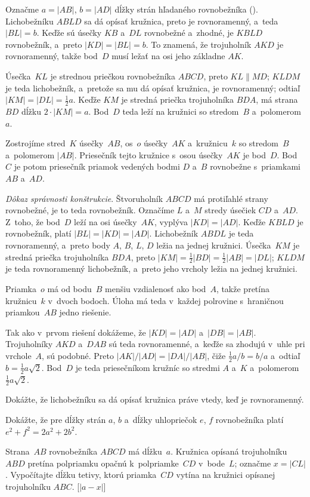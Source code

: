 {%
Označme $a=|AB|$, $b=|AD|$ dĺžky strán hľadaného rovnobežníka (\obr). Lichobežníku $ABLD$ sa dá opísať kružnica, preto je rovnoramenný, a~teda $|BL|=b$. Keďže sú úsečky $KB$ a~$DL$ rovnobežné a~zhodné, je $KBLD$ rovnobežník, a~preto $|KD|=|BL|=b$. To znamená, že trojuholník $AKD$ je rovnoramenný, takže bod~$D$ musí ležať na osi jeho základne $AK$.
%

Úsečka~$KL$ je strednou priečkou rovnobežníka $ABCD$, preto $KL \parallel MD$; $KLDM$ je teda lichobežník, a~pretože sa mu dá opísať kružnica, je rovnoramenný; odtiaľ $|KM|=|DL|=\frac12a$. Keďže $KM$ je stredná priečka trojuholníka $BDA$, má strana~$BD$ dĺžku $2\cdot|KM|=a$. Bod~$D$ teda leží na kružnici so stredom~$B$ a~polomerom~$a$.

\konstrukcia
Zostrojíme stred~$K$ úsečky~$AB$, os~$o$ úsečky~$AK$ a~kružnicu~$k$ so stredom~$B$ a~polomerom $|AB|$. Priesečník tejto kružnice s~osou úsečky~$AK$ je bod~$D$. Bod~$C$ je potom priesečník priamok vedených bodmi $D$ a~$B$ rovnobežne s~priamkami $AB$ a~$AD$.

\smallskip
{\it Dôkaz správnosti konštrukcie}.
Štvoruholník $ABCD$ má protiľahlé strany rovnobežné, je to teda rovnobežník. Označíme $L$ a~$M$ stredy úsečiek $CD$ a~$AD$. Z~toho, že bod~$D$ leží na osi úsečky~$AK$, vyplýva $|KD|=|AD|$. Keďže $KBLD$ je rovnobežník, platí $|BL|=|KD|=|AD|$. Lichobežník $ABDL$ je teda rovnoramenný, a~preto body $A$, $B$, $L$, $D$ ležia na jednej kružnici. Úsečka~$KM$ je stredná priečka trojuholníka $BDA$, preto $|KM|=\frac12|BD|=\frac12|AB|=|DL|$; $KLDM$ je teda rovnoramenný lichobežník, a~preto jeho vrcholy ležia na jednej kružnici.

\diskusia
Priamka~$o$ má od bodu~$B$ menšiu vzdialenosť ako bod~$A$, takže pretína kružnicu~$k$ v~dvoch bodoch. Úloha má teda v~každej polrovine s~hraničnou priamkou~$AB$ jedno riešenie.

\ineriesenie
Tak ako v~prvom riešení dokážeme, že $|KD|=|AD|$ a~$|DB|=|AB|$. Trojuholníky $AKD$ a~$DAB$ sú teda rovnoramenné, a~keďže sa zhodujú v~uhle pri vrchole~$A$, sú podobné. Preto ${|AK|}/{|AD|}={|DA|}/{|AB|}$, čiže $\frac12a/b=b/a$ a~odtiaľ $b=\frac12{a\sqrt 2}$. Bod~$D$ je teda priesečníkom kružníc so stredmi $A$ a~$K$ a~polomerom $\frac12{a\sqrt 2}$.

Dokážte, že lichobežníku sa dá opísať kružnica práve vtedy, keď je rovnoramenný.

Dokážte, že pre dĺžky strán $a$, $b$ a~dĺžky uhlopriečok $e$, $f$ rovnobežníka platí $e^2+f^2=2a^2+2b^2$.

\D
Strana~$AB$ rovnobežníka $ABCD$ má dĺžku~$a$. Kružnica opísaná trojuholníku $ABD$ pretína polpriamku opačnú k~polpriamke~$CD$ v~bode~$L$; označme $x=|CL|$. Vypočítajte dĺžku tetivy, ktorú priamka~$CD$ vytína na kružnici opísanej trojuholníku $ABC$. [$|a-x|$]
}

